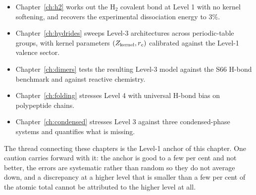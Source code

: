 \begin{itemize}
\item Chapter~\ref{ch:h2} works out the H$_2$ covalent bond at Level 1 with no kernel softening,
and recovers the experimental dissociation energy to $3\%$.
\item Chapter~\ref{ch:hydrides} sweeps Level-3 architectures across periodic-table groups, with
kernel parameters $(Z_{\rm kernel}, r_c)$ calibrated against the Level-1 valence sector.
\item Chapter~\ref{ch:dimers} tests the resulting Level-3 model against the S66 H-bond benchmark
and against reactive chemistry.
\item Chapter~\ref{ch:folding} stresses Level 4 with universal H-bond bias on polypeptide chains.
\item Chapter~\ref{ch:condensed} stresses Level 3 against three condensed-phase systems and
quantifies what is missing.
\end{itemize}

The thread connecting these chapters is the Level-1 anchor of this chapter. One caution carries
forward with it: the anchor is good to a few per cent and not better, the errors are systematic
rather than random so they do not average down, and a discrepancy at a higher level that is
smaller than a few per cent of the atomic total cannot be attributed to the higher level at all.

